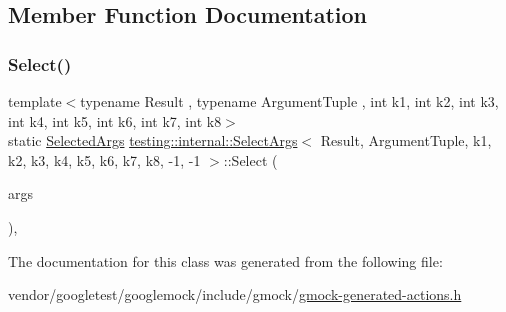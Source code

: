 \subsection{Member Function Documentation}
\mbox{\label{classtesting_1_1internal_1_1_select_args_3_01_result_00_01_argument_tuple_00_01k1_00_01k2_00_01ke29a32f440a8fcb098d8685a265f9f40_a3f3b801b32c8cb88c31bc39cf0e25bb7}} 
\subsubsection{\texorpdfstring{Select()}{Select()}}
{\footnotesize\ttfamily template$<$typename Result , typename Argument\+Tuple , int k1, int k2, int k3, int k4, int k5, int k6, int k7, int k8$>$ \\
static \hyperlink{classtesting_1_1internal_1_1_select_args_3_01_result_00_01_argument_tuple_00_01k1_00_01k2_00_01ke29a32f440a8fcb098d8685a265f9f40_a964de7fbb2ffb6acf0d7d80528cda6ba}{Selected\+Args} \hyperlink{classtesting_1_1internal_1_1_select_args}{testing\+::internal\+::\+Select\+Args}$<$ Result, Argument\+Tuple, k1, k2, k3, k4, k5, k6, k7, k8, -\/1, -\/1 $>$\+::Select (\begin{DoxyParamCaption}\item[{const Argument\+Tuple \&}]{args }\end{DoxyParamCaption})\hspace{0.3cm}{\ttfamily [inline]}, {\ttfamily [static]}}



The documentation for this class was generated from the following file\+:\begin{DoxyCompactItemize}
\item 
vendor/googletest/googlemock/include/gmock/\hyperlink{gmock-generated-actions_8h}{gmock-\/generated-\/actions.\+h}\end{DoxyCompactItemize}
